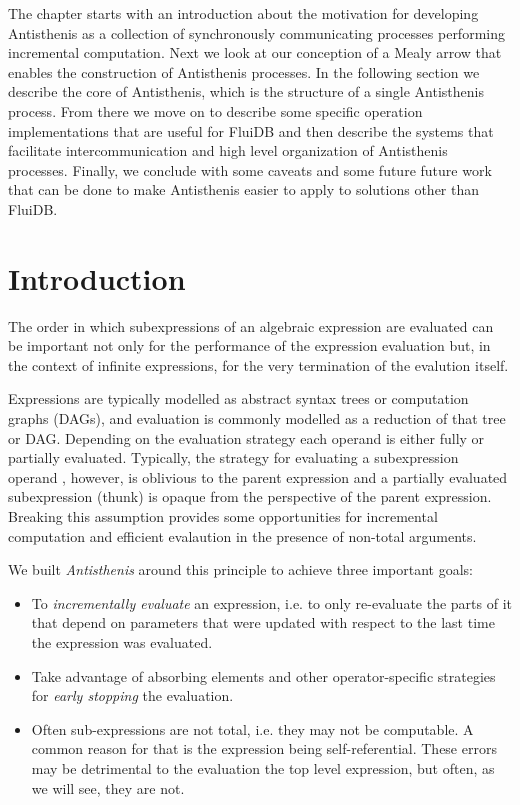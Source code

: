 The chapter starts with an introduction about the motivation for
developing Antisthenis as a collection of synchronously communicating
processes performing incremental computation. Next we look at our
conception of a Mealy arrow that enables the construction of
Antisthenis processes. In the following section we describe the core
of Antisthenis, which is the structure of a single Antisthenis
process. From there we move on to describe some specific operation
implementations that are useful for FluiDB and then describe the
systems that facilitate intercommunication and high level organization
of Antisthenis processes. Finally, we conclude with some caveats and
some future future work that can be done to make Antisthenis easier to
apply to solutions other than FluiDB.

\section{Introduction}
\label{sec:antisthenis_intro}

The order in which subexpressions of an algebraic expression are
evaluated can be important not only for the performance of the
expression evaluation but, in the context of infinite expressions, for
the very termination of the evalution itself.

Expressions are typically modelled as abstract syntax trees or
computation graphs (DAGs), and evaluation is commonly modelled as a
reduction of that tree or DAG. Depending on the evaluation strategy
each operand is either fully or partially evaluated. Typically, the
strategy for evaluating a subexpression operand , however, is
oblivious to the parent expression and a partially evaluated
subexpression (thunk) is opaque from the perspective of the parent
expression. Breaking this assumption provides some opportunities for
incremental computation and efficient evalaution in the presence of
non-total arguments.

We built \emph{Antisthenis} around this principle to achieve three
important goals:

\begin{itemize}
\item To \emph{incrementally evaluate} an expression, i.e. to only
  re-evaluate the parts of it that depend on parameters that were
  updated with respect to the last time the expression was evaluated.
\item Take advantage of absorbing elements and other operator-specific
  strategies for \emph{early stopping} the evaluation.
\item Often sub-expressions are not total, i.e. they may not be
  computable. A common reason for that is the expression being
  self-referential. These errors may be detrimental to the evaluation
  the top level expression, but often, as we will see, they are not.
\end{itemize}

